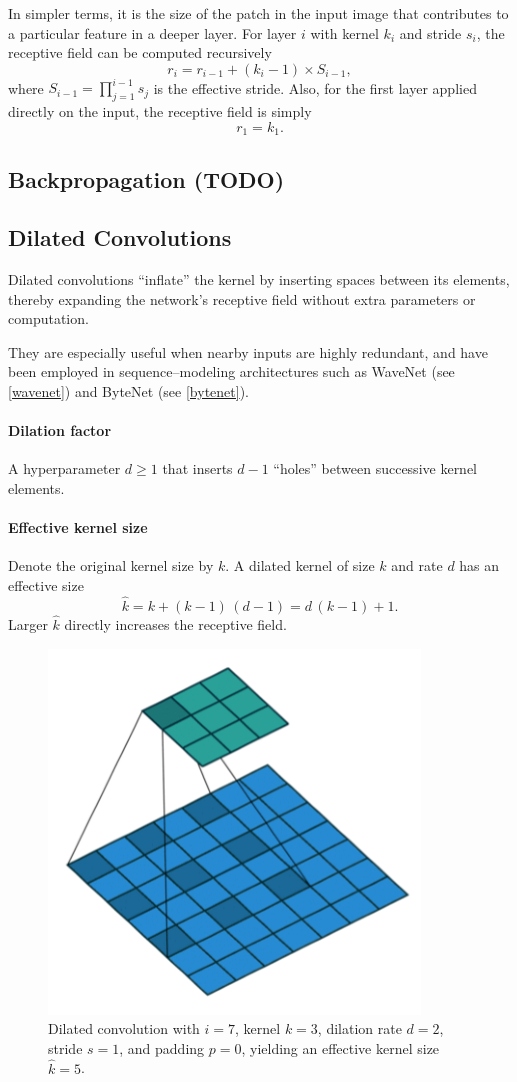 \documentclass{article}
\begin{document}
In simpler terms, it is the size of the patch in the input image that contributes to a particular feature in a deeper layer. For layer \(i\) with kernel \(k_i\) and stride \(s_i\), the receptive field can be computed recursively
\[
r_i = r_{i-1} + (k_i - 1) \times S_{i-1},
\]
where \(S_{i-1} = \prod_{j=1}^{i-1} s_j\) is the effective stride. Also, for the first layer applied directly on the input, the receptive field is simply
\[
r_1 = k_1.
\]

\subsection{Backpropagation (TODO)}

\subsection{Dilated Convolutions}
Dilated convolutions “inflate” the kernel by inserting spaces between its elements, thereby expanding the network’s receptive field without extra parameters or computation.

They are especially useful when nearby inputs are highly redundant, and have been employed in sequence–modeling architectures such as WaveNet (see \ref{wavenet}) and ByteNet (see \ref{bytenet}).

\paragraph{Dilation factor}
A hyperparameter $d\ge1$ that inserts $d-1$ “holes” between successive kernel elements.

\paragraph{Effective kernel size}
Denote the original kernel size by $k$.  A dilated kernel of size $k$ and rate $d$ has an effective size
\[
\hat k
= k + (k-1)\,(d-1)
= d\,(k-1) + 1.
\]
Larger $\hat k$ directly increases the receptive field.

\begin{figure}[ht]
    \centering
    \includegraphics[width=0.3\linewidth]{graphics/S5CNN/dilated_conv.png}
    \caption{Dilated convolution with $i=7$, kernel $k=3$, dilation rate $d=2$, stride $s=1$, and padding $p=0$, yielding an effective kernel size $\hat k = 5$.}
    \label{fig:dilated-conv}
\end{figure}
\end{document}
